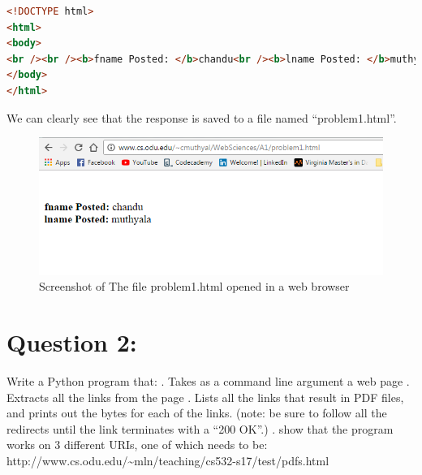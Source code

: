 \documentclass[a4paper, 11pt]{article}
\begin{document}
\begin{lstlisting}[language=html,label=Output:,caption=Output: The output of problem1.php]     
<!DOCTYPE html>
<html>
<body>
<br /><br /><b>fname Posted: </b>chandu<br /><b>lname Posted: </b>muthyala<br />
</body>
</html>
\end{lstlisting}
We can clearly see that the response is saved to a file named ``problem1.html''.


\begin{figure}[h]
\caption{Screenshot of The file problem1.html opened in a web browser}
\centering
\includegraphics[scale=0.76]{problem1.png}
\end{figure}
\section*{Question 2:}
Write a Python program that:
\newline
{}. Takes as a command line argument a web page
\newline
{}. Extracts all the links from the page
\newline
{}. Lists all the links that result in PDF files, and prints out the bytes for each of the links. 
\newline
\indent
(note: be sure to follow all the redirects until the link terminates with a ``200 OK''.)
\newline
{}. show that the program works on 3 different URIs, one of which needs to be:
\newline
\indent
http://www.cs.odu.edu/\textasciitilde mln/teaching/cs532-s17/test/pdfs.html
     
\end{document}
